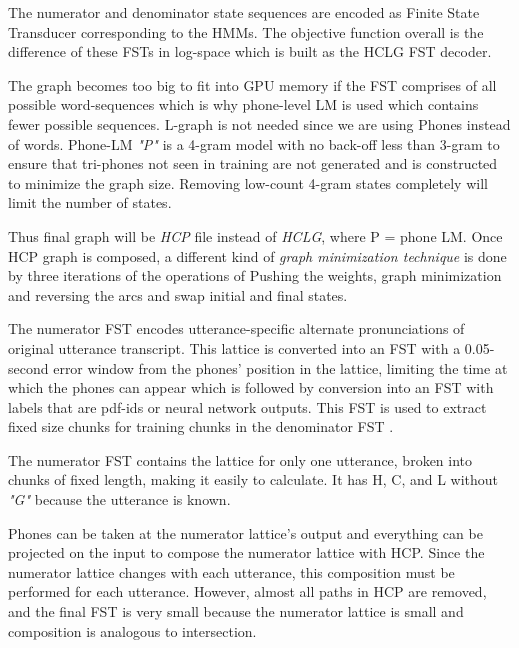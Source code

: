 The numerator and denominator state sequences are encoded as Finite State Transducer corresponding to the HMMs. The objective function overall is the difference of these FSTs in log-space which is built as the HCLG FST decoder. 

The graph becomes too big to fit into GPU memory if the FST comprises of all possible word-sequences \cite{raj_experiments_nodate} which is why phone-level LM is used which contains fewer possible sequences. L-graph is not needed since we are using Phones instead of words. Phone-LM \textit{"P"} is a 4-gram model with no back-off less than 3-gram to ensure that tri-phones not seen in training are not generated and is constructed to minimize the graph size. Removing low-count 4-gram states completely will limit the number of states. 

Thus final graph will be \textit{HCP} file instead of \textit{HCLG}, where P = phone LM. Once HCP graph is composed, a different kind of \textit{graph minimization technique} is done by three iterations of the operations of Pushing the weights, graph minimization and reversing the arcs and swap initial and final states.

The numerator FST encodes utterance-specific alternate pronunciations of original utterance transcript. This lattice is converted into an FST with a 0.05-second error window from the phones' position in the lattice, limiting the time at which the phones can appear which is followed by conversion into an FST with labels that are pdf-ids or neural network outputs. This FST is used to extract fixed size chunks for training chunks in the denominator FST \cite{raj_experiments_nodate}.

The numerator FST contains the lattice for only one utterance, broken into chunks of fixed length, making it easily to calculate. It has H, C, and L without \textit{"G"} because the utterance is known. 

Phones can be taken at the numerator lattice's output and everything can be projected on the input to compose the numerator lattice with HCP. Since the numerator lattice changes with each utterance, this composition must be performed for each utterance. However, almost all paths in HCP are removed, and the final FST is very small because the numerator lattice is small and composition is analogous to intersection.

